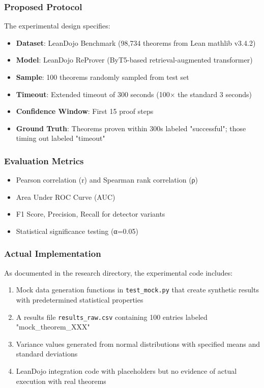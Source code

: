 
\subsubsection{Proposed Protocol}

The experimental design specifies:

\begin{itemize}
\item \textbf{Dataset}: LeanDojo Benchmark (98,734 theorems from Lean mathlib v3.4.2)
\item \textbf{Model}: LeanDojo ReProver (ByT5-based retrieval-augmented transformer)
\item \textbf{Sample}: 100 theorems randomly sampled from test set
\item \textbf{Timeout}: Extended timeout of 300 seconds (100× the standard 3 seconds)
\item \textbf{Confidence Window}: First 15 proof steps
\item \textbf{Ground Truth}: Theorems proven within 300s labeled "successful"; those timing out labeled "timeout"
\end{itemize}

\subsubsection{Evaluation Metrics}

\begin{itemize}
\item Pearson correlation (r) and Spearman rank correlation (ρ)
\item Area Under ROC Curve (AUC)
\item F1 Score, Precision, Recall for detector variants
\item Statistical significance testing (α=0.05)
\end{itemize}

\subsubsection{Actual Implementation}

As documented in the research directory, the experimental code includes:

\begin{enumerate}
\item Mock data generation functions in \texttt{test_mock.py} that create synthetic results with predetermined statistical properties
\item A results file \texttt{results_raw.csv} containing 100 entries labeled "mock_theorem_XXX"
\item Variance values generated from normal distributions with specified means and standard deviations
\item LeanDojo integration code with placeholders but no evidence of actual execution with real theorems
\end{enumerate}

